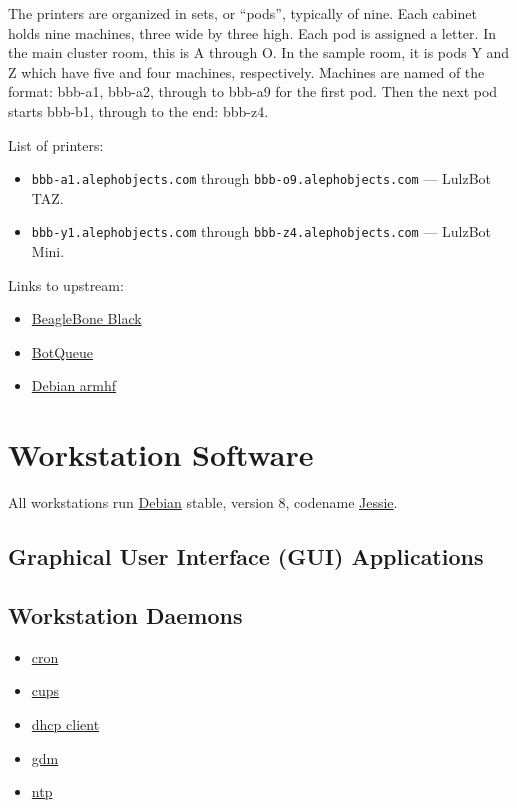 The printers are organized in sets, or ``pods'', typically of nine. Each cabinet
holds nine machines, three wide by three high. Each pod is assigned a letter.
In the main cluster room, this is A through O. In the sample room, it is pods
Y and Z which have five and four machines, respectively. Machines are named
of the format: bbb-a1, bbb-a2, through to bbb-a9 for the first pod. Then the
next pod starts bbb-b1, through to the end: bbb-z4.

List of printers:
\begin{itemize}
\item \texttt{bbb-a1.alephobjects.com} through
      \texttt{bbb-o9.alephobjects.com} --- LulzBot TAZ.
\item \texttt{bbb-y1.alephobjects.com} through
      \texttt{bbb-z4.alephobjects.com} --- LulzBot Mini.
\end{itemize}

Links to upstream:
\begin{itemize}
\item \href{http://beagleboard.org/}{BeagleBone Black}
\item \href{http://botqueue.org/}{BotQueue}
\item \href{https://wiki.debian.org/ArmHardFloatPort}{Debian armhf}
\end{itemize}

\section{Workstation Software}

All workstations run \href{http://www.debian.org/}{Debian} stable, version 8,
codename \href{https://www.debian.org/releases/jessie/}{Jessie}.

\subsection{Graphical User Interface (GUI) Applications}


\subsection{Workstation Daemons}
\begin{itemize}
\item \href{http://ftp.isc.org/isc/cron/}{cron}
\item \href{http://www.cups.org/}{cups}
\item \href{http://www.isc.org/}{dhcp client}
\item \href{https://wiki.gnome.org/Projects/GDM}{gdm}
\item \href{http://support.ntp.org/}{ntp}
\end{itemize}

